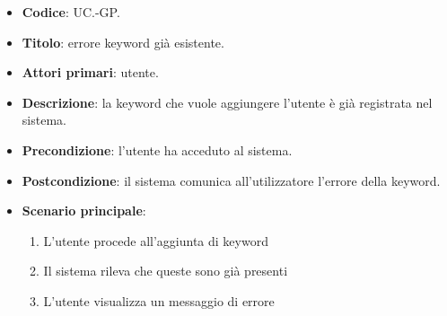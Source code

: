 	\begin{itemize}
		\item \textbf{Codice}: UC\theuccount.\thesubuccount-GP.
		\item \textbf{Titolo}: errore keyword già esistente.
		\item \textbf{Attori primari}: utente.
		\item \textbf{Descrizione}: la keyword che vuole aggiungere l'utente è già registrata nel sistema.
		\item \textbf{Precondizione}:  l’utente ha acceduto al sistema.
		\item \textbf{Postcondizione}: il sistema comunica all’utilizzatore l’errore della keyword.
		\item \textbf{Scenario principale}:
		\begin{enumerate}
			\item L'utente procede all'aggiunta di keyword
			\item Il sistema rileva che queste sono già presenti
			\item L'utente visualizza un messaggio di errore
		\end{enumerate}
	\end{itemize}
